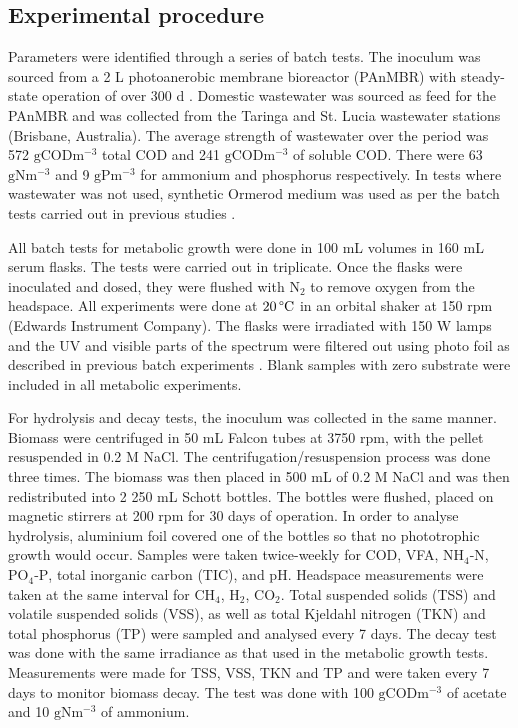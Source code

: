 \subsection{Experimental procedure}
Parameters were identified through a series of batch tests. The inoculum was sourced from a 2 L photoanerobic membrane bioreactor (PAnMBR) with steady-state operation of over 300 d \cite{Hulsen2016}. Domestic wastewater was sourced as feed for the PAnMBR and was collected from the Taringa and St. Lucia wastewater stations (Brisbane, Australia). The average strength of wastewater over the period was 572 $\mathrm{g COD m^{-3}}$ total COD and 241 $\mathrm{g COD m^{-3}}$ of soluble COD. There were 63 $\mathrm{g N m^{-3}}$ and 9 $\mathrm{g P m^{-3}}$ for ammonium and phosphorus respectively. In tests where wastewater was not used, synthetic Ormerod medium was used as per the batch tests carried out in previous studies \cite{Hulsen2014}. 

All batch tests for metabolic growth were done in 100 mL volumes in 160 mL serum flasks. The tests were carried out in triplicate. Once the flasks were inoculated and dosed, they were flushed with $\mathrm{N_2}$ to remove oxygen from the headspace. All experiments were done at $\mathrm{20 \, \degree C}$ in an orbital shaker at 150 rpm (Edwards Instrument Company). The flasks were irradiated with 150 W lamps and the UV and visible parts of the spectrum were filtered out using photo foil as described in previous batch experiments \cite{Hulsen2014}. Blank samples with zero substrate were included in all metabolic experiments.

For hydrolysis and decay tests, the inoculum was collected in the same manner. Biomass were centrifuged in 50 mL Falcon tubes at 3750 rpm, with the pellet resuspended in 0.2 M NaCl. The centrifugation/resuspension process was done three times. The biomass was then placed in 500 mL of 0.2 M NaCl and was then redistributed into 2 250 mL Schott bottles. The bottles were flushed, placed on magnetic stirrers at 200 rpm for 30 days of operation. In order to analyse hydrolysis, aluminium foil covered one of the bottles so that no phototrophic growth would occur. Samples were taken twice-weekly for COD, VFA, $\mathrm{NH_4\mbox{-}N}$, $\mathrm{PO_4\mbox{-}P}$, total inorganic carbon (TIC), and pH. Headspace measurements were taken at the same interval for $\mathrm{CH_4}$, $\mathrm{H_2}$, $\mathrm{CO_2}$. Total suspended solids (TSS) and volatile suspended solids (VSS), as well as total Kjeldahl nitrogen (TKN) and total phosphorus (TP) were sampled and analysed every 7 days. The decay test was done with the same irradiance as that used in the metabolic growth tests. Measurements were made for TSS, VSS, TKN and TP and were taken every 7 days to monitor biomass decay. The test was done with 100 $\mathrm{g COD m^{-3}}$ of acetate and 10 $\mathrm{g N m^{-3}}$ of ammonium. 

